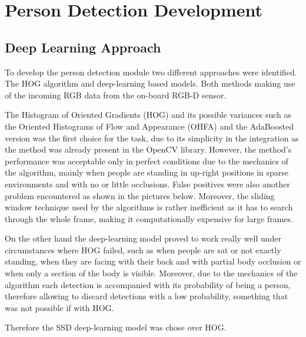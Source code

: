 \chapter{Person Detection Development}
\label{chapter3}

\section{Deep Learning Approach}

To develop the person detection module two different approaches were identified. The HOG algorithm and deep-learning based models. Both methods making use of the incoming RGB data from the on-board RGB-D sensor.

The Histogram of Oriented Gradients (HOG) and its possible variances such as the Oriented Histograms of Flow and Appearance (OHFA) and the AdaBoosted version was the first choice for the task, due to its simplicity in the integration as the method was already present in the OpenCV library. However, the method's performance was acceptable only in perfect conditions due to the mechanics of the algorithm, mainly when people are standing in up-right positions in sparse environments and with no or little occlusions. False positives were also another problem encountered as shown in the pictures below. Moreover, the sliding window technique used by the algorithms is rather inefficient as it has to search through the whole frame, making it computationally expensive for large frames.

On the other hand the deep-learning model proved to work really well under circumstances where HOG failed, such as when people are sat or not exactly standing, when they are facing with their back and with partial body occlusion or when only a section of the body is visible. Moreover, due to the mechanics of the algorithm each detection is accompanied with its probability of being a person, therefore allowing to discard detections with a low probability, something that was not possible if with HOG.

Therefore the SSD deep-learning model was chose over HOG.

